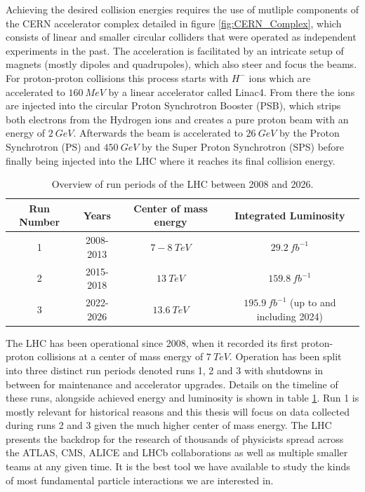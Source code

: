 Achieving the desired collision energies requires the use of mutliple components of the CERN accelerator complex 
detailed in figure \ref{fig:CERN_Complex}, which consists of linear and smaller circular colliders that were operated 
as independent experiments in the past. The acceleration is facilitated by an intricate setup of magnets (mostly 
dipoles and quadrupoles), 
which also steer and focus the beams. For proton-proton collisions this process starts with $H^-$ ions which are 
accelerated to $160\ MeV$ by a linear accelerator called Linac4. From there the ions are injected into the circular  
Proton Synchrotron Booster (PSB), which strips both electrons from the Hydrogen ions and creates a pure proton beam with 
an energy of $2\ GeV$. Afterwards the beam is accelerated to $26\ GeV$ by the Proton Synchrotron (PS) and $450\ GeV$ by the Super Proton Synchrotron (SPS) before finally being injected into the LHC where it reaches its final collision energy. 
\par

\begin{table}
\begin{center}
\caption{Overview of run periods of the LHC between 2008 and 2026.}
\label{table-lhc-runs}
\begin{tabular}{|c c c c|} 
 \hline
 Run Number & Years & Center of mass energy & Integrated Luminosity \\ [0.5ex] 
 \hline
 1 & 2008-2013 & $7-8\ TeV$ & $29.2\ fb^{-1}$ \\ 
 2 & 2015-2018 & $13\ TeV$ & $159.8\ fb^{-1}$ \\ 
 3 & 2022-2026 & $13.6\ TeV$ & $195.9\ fb^{-1}$ (up to and including 2024) \\ 
 \hline
\end{tabular}
\end{center}
\end{table}

The LHC has been operational since 2008, when it recorded its first proton-proton collisions at a center of mass energy 
of $7\ TeV$. Operation has been split into three distinct run periods denoted runs 1, 2 and 3 with shutdowns in 
between for maintenance and accelerator upgrades. Details on the timeline of these runs, alongside achieved energy and 
luminosity is shown in table \ref{table-lhc-runs}. Run 1 is mostly relevant for historical reasons and this thesis will 
focus on data collected during runs 2 and 3 given the much higher center of mass energy. The LHC presents the backdrop 
for the research of thousands of physicists spread across the ATLAS, CMS, ALICE and LHCb collaborations as well as 
multiple smaller teams at any given time. It is the best tool we have available to study the kinds of most fundamental 
particle interactions we are interested in.

